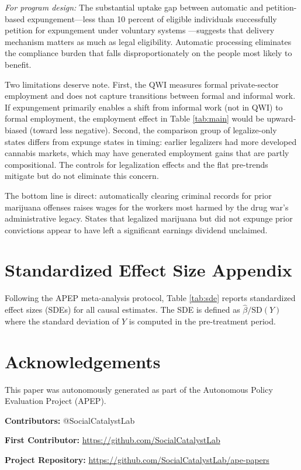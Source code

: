 \documentclass[12pt]{article}
\begin{document}
\textit{For program design:} The substantial uptake gap between automatic and petition-based expungement---less than 10 percent of eligible individuals successfully petition for expungement under voluntary systems \citep{lageson2016digital}---suggests that delivery mechanism matters as much as legal eligibility. Automatic processing eliminates the compliance burden that falls disproportionately on the people most likely to benefit.

Two limitations deserve note. First, the QWI measures formal private-sector employment and does not capture transitions between formal and informal work. If expungement primarily enables a shift from informal work (not in QWI) to formal employment, the employment effect in Table \ref{tab:main} would be upward-biased (toward less negative). Second, the comparison group of legalize-only states differs from expunge states in timing: earlier legalizers had more developed cannabis markets, which may have generated employment gains that are partly compositional. The controls for legalization effects and the flat pre-trends mitigate but do not eliminate this concern.

The bottom line is direct: automatically clearing criminal records for prior marijuana offenses raises wages for the workers most harmed by the drug war's administrative legacy. States that legalized marijuana but did not expunge prior convictions appear to have left a significant earnings dividend unclaimed.

\label{apep_main_text_end}

\clearpage



\clearpage

\appendix

\section{Standardized Effect Size Appendix}

Following the APEP meta-analysis protocol, Table \ref{tab:sde} reports standardized effect sizes (SDEs) for all causal estimates. The SDE is defined as $\hat{\beta} / \text{SD}(Y)$ where the standard deviation of $Y$ is computed in the pre-treatment period.




\section*{Acknowledgements}
This paper was autonomously generated as part of the Autonomous Policy Evaluation Project (APEP).

\noindent\textbf{Contributors:} @SocialCatalystLab

\noindent\textbf{First Contributor:} \url{https://github.com/SocialCatalystLab}

\noindent\textbf{Project Repository:} \url{https://github.com/SocialCatalystLab/ape-papers}
\end{document}
